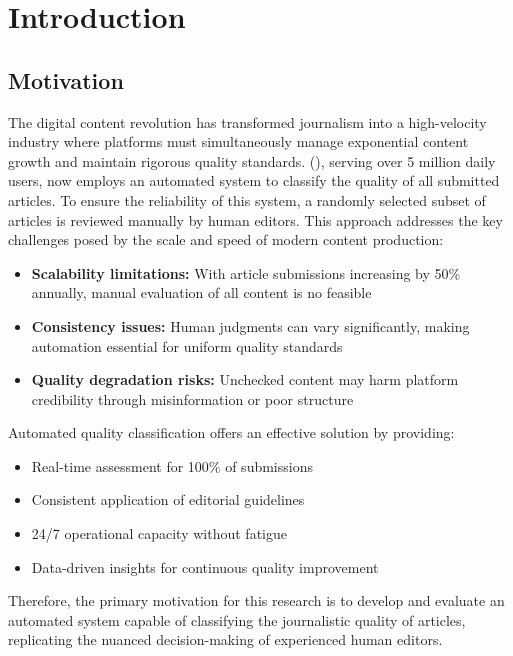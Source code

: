 
\chapter{Introduction\label{chap:introduction}}

\section{Motivation}

The digital content revolution has transformed journalism into a high-velocity industry where platforms must simultaneously manage exponential content growth and maintain rigorous quality standards. \cite{seznam2025} (), serving over 5 million daily users, now employs an automated system to classify the quality of all submitted articles. To ensure the reliability of this system, a randomly selected subset of articles is reviewed manually by human editors. This approach addresses the key challenges posed by the scale and speed of modern content production:
\begin{itemize}
\item \textbf{Scalability limitations:} With article submissions increasing by 50\% annually, manual evaluation of all content is no feasible
\item \textbf{Consistency issues:} Human judgments can vary significantly, making automation essential for uniform quality standards
\item \textbf{Quality degradation risks:} Unchecked content may harm platform credibility through misinformation or poor structure
\end{itemize}

Automated quality classification offers an effective solution by providing:
\begin{itemize}
\item Real-time assessment for 100\% of submissions
\item Consistent application of editorial guidelines
\item 24/7 operational capacity without fatigue
\item Data-driven insights for continuous quality improvement
\end{itemize}

Therefore, the primary motivation for this research is to develop and evaluate an automated system capable of classifying the journalistic quality of articles, replicating the nuanced decision-making of experienced human editors.

